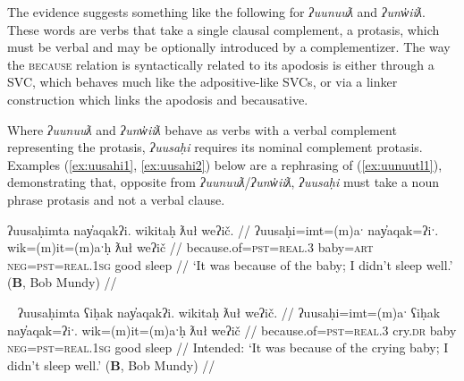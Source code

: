 The evidence suggests something like the following for \textit{ʔuunuuƛ} and \textit{ʔunw̓iiƛ}. These words are verbs that take a single clausal complement, a protasis, which must be verbal and may be optionally introduced by a complementizer. The way the \textsc{because} relation is syntactically related to its apodosis is either through a SVC, which behaves much like the adpositive-like SVCs, or via a linker construction which links the apodosis and becausative.


Where \textit{ʔuunuuƛ} and \textit{ʔunw̓iiƛ} behave as verbs with a verbal complement representing the protasis, \textit{ʔuusaḥi} requires its nominal complement protasis. Examples (\ref{ex:uusahi1}, \ref{ex:uusahi2}) below are a rephrasing of (\ref{ex:uunuutl1}), demonstrating that, opposite from \textit{ʔuunuuƛ}/\textit{ʔunw̓iiƛ}, \textit{ʔuusaḥi} must take a noun phrase protasis and not a verbal clause. 

\ex \label{ex:uusahi1}
\begingl
\glpreamble ʔuusaḥimta nay̓aqakʔi. wikitaḥ ƛuł weʔič. //
\gla ʔuusaḥi=imt=(m)aˑ nay̓aqak=ʔiˑ. wik=(m)it=(m)aˑḥ ƛuł weʔič //
\glb because.of=\textsc{pst}=\textsc{real.3} baby=\textsc{art} \textsc{neg}=\textsc{pst}=\textsc{real.1sg} good sleep //
\glft `It was because of the baby; I didn't sleep well.' (\textbf{B}, Bob Mundy) //
\endgl
\xe

\ex~ \label{ex:uusahi2}
\begingl
\glpreamble *ʔuusaḥimta ʕiḥak nay̓aqakʔi. wikitaḥ ƛuł weʔič. //
\gla ʔuusaḥi=imt=(m)aˑ ʕiḥak nay̓aqak=ʔiˑ. wik=(m)it=(m)aˑḥ ƛuł weʔič //
\glb because.of=\textsc{pst}=\textsc{real.3} cry.\textsc{dr} baby \textsc{neg}=\textsc{pst}=\textsc{real.1sg} good sleep //
\glft Intended: `It was because of the crying baby; I didn't sleep well.' (\textbf{B}, Bob Mundy) //
\endgl
\xe

